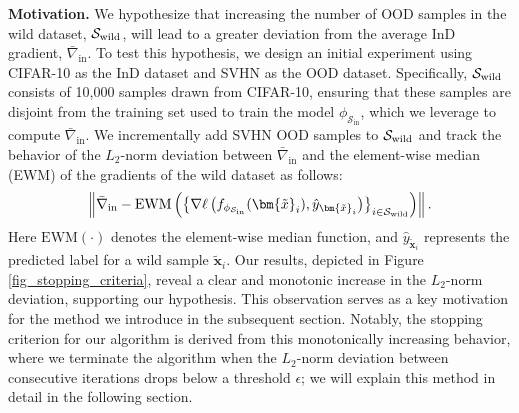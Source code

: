 \documentclass[10pt]{article} %
\theoremstyle{plain}
\theoremstyle{definition}
\begin{document}
\textbf{Motivation.}
We hypothesize that increasing the number of OOD samples in the wild dataset, $\mathcal{S}_{\rm wild}$, will lead to a greater deviation from the average InD gradient, $\bar{\nabla}_{\text{in}}$. To test this hypothesis, we design an initial experiment using CIFAR-10 \citep{krizhevsky2009learning} as the InD dataset and SVHN \citep{netzer2011reading} as the OOD dataset. Specifically, $\mathcal{S}_{\rm wild}$ consists of 10,000 samples drawn from CIFAR-10, ensuring that these samples are disjoint from the training set used to train the model $\phi_{\mathcal{S}_{\text{in}}}$, which we leverage to compute $\bar{\nabla}_{\text{in}}$. We incrementally add SVHN OOD samples to $\mathcal{S}_{\rm wild}$ and track the behavior of the $L_2$-norm deviation between $\bar{\nabla}_{\text{in}}$ and the element-wise median (EWM) of the gradients of the wild dataset as follows:
\begin{align}
\left\| \bar{\nabla}_{\text{in}} - {\rm EWM}\left(\left\{\nabla \ell \left(f_{\phi_{{\cal S}_{\text{in}}}}(\bm{\tilde{x}}_{i}), \hat{y}_{\bm{\tilde{x}}_{i}} \right)\right\}_{i \in \mathcal{S}_{\rm wild}}\right) \right\|.
\end{align}
Here \( \text{EWM}(\cdot) \) denotes the element-wise median function, and \( \hat{y}_{\bm{\tilde{x}}_i}
\) represents the predicted label for a wild sample \( {\bm{\tilde{x}}_i}.\)
Our results, depicted in Figure \ref{fig_stopping_criteria}, reveal a clear and monotonic increase in the $L_2$-norm deviation, supporting our hypothesis. This observation serves as a key motivation for the method we introduce in the subsequent section. Notably, the stopping criterion for our algorithm is derived from this monotonically increasing behavior, where we terminate the algorithm when the $L_2$-norm deviation between consecutive iterations drops below a threshold $\epsilon$; we will explain this method in detail in the following section.

 
\end{document}
